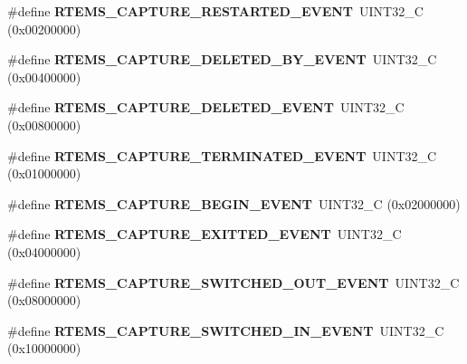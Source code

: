 \begin{DoxyCompactItemize}
\item 
\mbox{\label{group__libmisc__capture_gaef50955077bf12ecec2e5457522397f6}} 
\#define {\bfseries R\+T\+E\+M\+S\+\_\+\+C\+A\+P\+T\+U\+R\+E\+\_\+\+R\+E\+S\+T\+A\+R\+T\+E\+D\+\_\+\+E\+V\+E\+NT}~U\+I\+N\+T32\+\_\+C (0x00200000)
\item 
\mbox{\label{group__libmisc__capture_gaa427e0422cdc960349b4d4c2f04e2991}} 
\#define {\bfseries R\+T\+E\+M\+S\+\_\+\+C\+A\+P\+T\+U\+R\+E\+\_\+\+D\+E\+L\+E\+T\+E\+D\+\_\+\+B\+Y\+\_\+\+E\+V\+E\+NT}~U\+I\+N\+T32\+\_\+C (0x00400000)
\item 
\mbox{\label{group__libmisc__capture_gaba3931ae6c14db4aa95ca57efa9aa30f}} 
\#define {\bfseries R\+T\+E\+M\+S\+\_\+\+C\+A\+P\+T\+U\+R\+E\+\_\+\+D\+E\+L\+E\+T\+E\+D\+\_\+\+E\+V\+E\+NT}~U\+I\+N\+T32\+\_\+C (0x00800000)
\item 
\mbox{\label{group__libmisc__capture_ga1c007e076ca6d667942037f7cfa7fd6d}} 
\#define {\bfseries R\+T\+E\+M\+S\+\_\+\+C\+A\+P\+T\+U\+R\+E\+\_\+\+T\+E\+R\+M\+I\+N\+A\+T\+E\+D\+\_\+\+E\+V\+E\+NT}~U\+I\+N\+T32\+\_\+C (0x01000000)
\item 
\mbox{\label{group__libmisc__capture_gadaf158ede2d142020f39710692a1776a}} 
\#define {\bfseries R\+T\+E\+M\+S\+\_\+\+C\+A\+P\+T\+U\+R\+E\+\_\+\+B\+E\+G\+I\+N\+\_\+\+E\+V\+E\+NT}~U\+I\+N\+T32\+\_\+C (0x02000000)
\item 
\mbox{\label{group__libmisc__capture_gae825bdd10c4ee6af10cb195859e6ba46}} 
\#define {\bfseries R\+T\+E\+M\+S\+\_\+\+C\+A\+P\+T\+U\+R\+E\+\_\+\+E\+X\+I\+T\+T\+E\+D\+\_\+\+E\+V\+E\+NT}~U\+I\+N\+T32\+\_\+C (0x04000000)
\item 
\mbox{\label{group__libmisc__capture_ga445733bb95dd1ac1d8cc26ee6edc40f9}} 
\#define {\bfseries R\+T\+E\+M\+S\+\_\+\+C\+A\+P\+T\+U\+R\+E\+\_\+\+S\+W\+I\+T\+C\+H\+E\+D\+\_\+\+O\+U\+T\+\_\+\+E\+V\+E\+NT}~U\+I\+N\+T32\+\_\+C (0x08000000)
\item 
\mbox{\label{group__libmisc__capture_gad1abe9637ccba304d57c4f484665eb23}} 
\#define {\bfseries R\+T\+E\+M\+S\+\_\+\+C\+A\+P\+T\+U\+R\+E\+\_\+\+S\+W\+I\+T\+C\+H\+E\+D\+\_\+\+I\+N\+\_\+\+E\+V\+E\+NT}~U\+I\+N\+T32\+\_\+C (0x10000000)

\end{DoxyCompactItemize}
